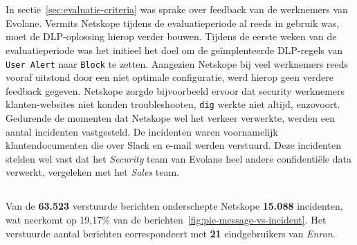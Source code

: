 
\chapter{}%
\label{ch:resultaten}

\section{}
\label{sec:inleiding-resultaten}

In sectie~\ref{sec:evaluatie-criteria} was sprake over feedback van de werknemers van Evolane.
Vermits Netskope tijdens de evaluatieperiode al reeds in gebruik was, moet de DLP-oplossing hierop verder bouwen.
Tijdens de eerste weken van de evaluatieperiode was het initieel het doel om de geïmplenteerde DLP-regels van \texttt{User Alert} naar \texttt{Block} te zetten.
Aangezien Netskope bij veel werknemers reeds vooraf uitstond door een niet optimale configuratie, werd hierop geen verdere feedback gegeven.
Netskope zorgde bijvoorbeeld ervoor dat security werknemers klanten-websites niet konden troubleshooten, \texttt{dig} werkte niet altijd, enzovoort.
Gedurende de momenten dat Netskope wel het verkeer verwerkte, werden een aantal incidenten vastgesteld.
De incidenten waren voornamelijk klantendocumenten die over Slack en e-mail werden verstuurd. 
Deze incidenten stelden wel vast dat het \textit{Security} team van Evolane heel andere confidentiële data verwerkt, vergeleken met het \textit{Sales} team.

\section{}
\label{sec:incidenten-resultaten}

Van de \textbf{63.523} verstuurde berichten onderschepte Netskope \textbf{15.088} incidenten, wat neerkomt op 19,17\% van de berichten~\ref{fig:pie-message-vs-incident}.
Het verstuurde aantal berichten correspondeert met \textbf{21} eindgebruikers van \textit{Enron}. 


